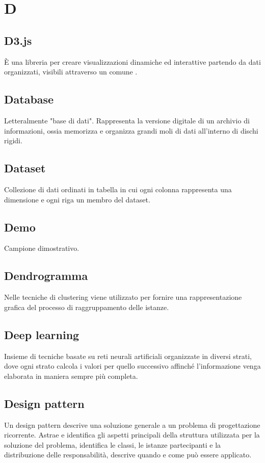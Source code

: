\section*{D}
\markright{}

\subsection*{D3.js}
È una libreria  per creare visualizzazioni dinamiche ed interattive partendo da dati organizzati, visibili attraverso un comune .

\subsection*{Database}
Letteralmente "base di dati". Rappresenta la versione digitale di un archivio di informazioni, ossia memorizza e organizza grandi moli di dati all'interno di dischi rigidi.

\subsection*{Dataset}
Collezione di dati ordinati in tabella in cui ogni colonna rappresenta una dimensione e ogni riga un membro del dataset.

\subsection*{Demo}
Campione dimostrativo.

\subsection*{Dendrogramma}
Nelle tecniche di clustering viene utilizzato per fornire una rappresentazione grafica del processo di raggruppamento delle istanze.

\subsection*{Deep learning}
Insieme di tecniche basate su reti neurali artificiali organizzate in diversi strati, dove ogni strato calcola i valori per quello successivo affinché l'informazione venga elaborata in maniera sempre più completa.

\subsection*{Design pattern}
Un design pattern descrive una soluzione generale a un problema di progettazione ricorrente. Astrae e identifica gli aspetti principali della struttura utilizzata per la soluzione del problema, identifica le classi, le istanze partecipanti e la distribuzione delle responsabilità, descrive quando e come può essere applicato. 

